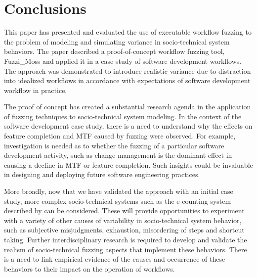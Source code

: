 \documentclass{llncs}
\begin{document}

\section{Conclusions}
\label{sec:conclusions}


This paper has presented and evaluated the use of executable workflow fuzzing to the problem of modeling and simulating
variance in socio-technical system behaviors.  The paper described a proof-of-concept workflow fuzzing tool, Fuzzi\_Moss
and applied it in a case study of software development workflows.  The approach was demonstrated to introduce realistic
variance due to distraction into idealized workflows in accordance with expectations of software development workflow in
practice.

The proof of concept has created a substantial research agenda in the application of fuzzing techniques to
socio-technical system modeling.  In the context of the software development case study, there is a need to understand
why the effects on feature completion and MTF caused by fuzzing were observed.  For example, investigation is needed as
to whether the fuzzing of a particular software development activity, such as change management is the dominant effect
in causing a decline in MTF or feature completion.  Such insights could be invaluable in designing and deploying future
software engineering practices.

More broadly, now that we have validated the approach with an initial case study, more complex socio-technical systems
such as the e-counting system described by \citet{lock07observations} can be considered.  These will provide
opportunities to experiment with a variety of other causes of variability in socio-technical system behavior, such as
subjective misjudgments, exhaustion, misordering of steps and shortcut taking.  Further interdisciplinary research is
required to develop and validate the realism of socio-technical fuzzing aspects that implement these behaviors. There is
a need to link empirical evidence of the causes and occurrence of these behaviors to their impact on the operation of
workflows.
\end{document}
